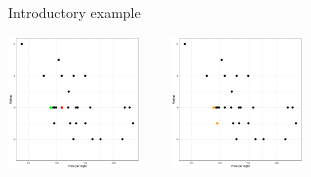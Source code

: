 \documentclass[11pt,compress,t,notes=noshow, xcolor=table]{beamer}
\begin{document}
\begin{vbframe}{Introductory example}
\begin{center}
\includegraphics[height=3.5cm, width =0.35\linewidth]{figure_man/Example1.png} ~~~ \includegraphics[height=3.5cm, width =0.35\linewidth]{figure_man/Example2.png}
\end{center}

%
%

\end{vbframe}
\end{document}
